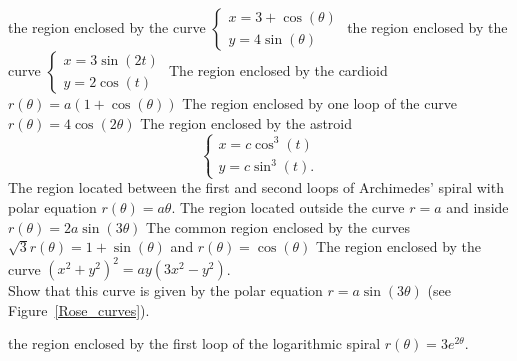 \begin{Exercise}
\ifanalysis
\ifanalysis\Question[difficulty = 2]\fi\ifcalculus\Question[difficulty = 3]\fi the region enclosed by the curve $\left\{\begin{array}{l} x = 3 + \cos(\theta) \\ y = 4 \sin(\theta)   \end{array} \right.$ 
\ifanalysis\Question[difficulty = 2]\fi\ifcalculus\Question[difficulty = 3]\fi the region enclosed by the curve $\left\{ \begin{array}{l} x = 3 \sin(2t) \\ y = 2 \cos(t)  \end{array}  \right.$ 
\Question[difficulty = 2] The region enclosed by the cardioid $r(\theta) = a(1+ \cos(\theta))$
\Question[difficulty = 2] The region enclosed by  one loop of the curve $r(\theta) = 4 \cos(2 \theta) $
\Question[difficulty = 2] The   region enclosed by  the astroid
\[ \left \{\begin{array}{l}
x = c \cos^3 (t)\\
y = c \sin^3 (t) .
\end{array}\right. \] 
\Question[difficulty = 2] The region located between the first and second loops of Archimedes' spiral with polar equation $ r(\theta) = a \theta$.  
\Question[difficulty = 3] The region located outside the curve $r=a$ and inside $r(\theta)=2a \sin(3 \theta)$
\Question[difficulty = 3] The common region enclosed by the curves $\sqrt{3} r(\theta)= 1+\sin(\theta)$ and $ r(\theta) = \cos(\theta)$
\Question[difficulty = 3] The region enclosed by the curve $( x^2 + y^2 )^2 = a y ( 3 x^2 - y^2)$. \\
Show that this curve is given by the polar equation $r=a\sin(3\theta)$ (see Figure~\ref{Rose_curves}).
\fi

\Question[difficulty = 3] the  region enclosed by the first loop of the logarithmic spiral $r(\theta) = 3 e^{2 \theta}$. 

\end{Exercise}


